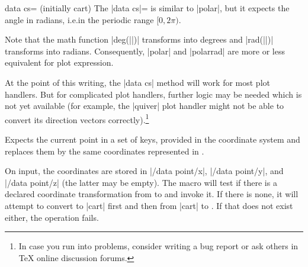 \begin{pgfplotskey}{data cs= (initially cart)}
    The |data cs|= is similar to |polar|, but it
    expects the angle in radians, i.e.\@ in the periodic range $[0,2\pi)$.
\begin{codeexample}[]
\end{codeexample}

    Note that the math function |deg(||)| transforms  into
    degrees and |rad(||)| transforms  into radians.
    Consequently, |polar| and |polarrad| are more or less equivalent for plot
    expression.

\begin{codeexample}[]
\end{codeexample}

    At the point of this writing, the |data cs| method will work for most plot
    handlers. But for complicated plot handlers, further logic may be needed
    which is not yet available (for example, the |quiver| plot handler might
    not be able to convert its direction vectors correctly).\footnote{In case
    you run into problems, consider writing a bug report or ask others in
    \TeX{} online discussion forums.}
\end{pgfplotskey}

\begin{command}{\pgfplotsaxistransformcs{}}
    Expects the current point in a set of keys, provided in the coordinate
    system  and replaces them by the same coordinates
    represented in .

    On input, the coordinates are stored in |/data point/x|, |/data point/y|,
    and |/data point/z| (the latter may be empty). The macro will test if there
    is a declared coordinate transformation from  to
     and invoke it. If there is none, it will attempt to convert
    to |cart| first and then from |cart| to . If that does not
    exist either, the operation fails.
\end{command}

